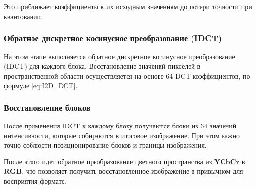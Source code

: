 Это приближает коэффициенты к их исходным значениям до потери точности при квантовании.




\subsubsection{Обратное дискретное косинусное преобразование (IDCT)}
На этом этапе выполняется обратное дискретное косинусное преобразование (IDCT) для каждого блока. 
Восстановление значений пикселей в пространственной области осуществляется на основе 64 DCT-коэффициентов, по формуле \eqref{eq:I2D_DCT}.


\subsubsection{Восстановление блоков}
После применения IDCT к каждому блоку получаются блоки из 64 значений интенсивности, которые собираются в итоговое изображение. 
При этом важно точно соблюсти позиционирование блоков и границы изображения.

После этого идет обратное преобразование цветного пространства из $\textbf{YCbCr}$ в $\textbf{RGB}$, 
что позволяет получить восстановленное изображение в привычном для восприятия формате.



